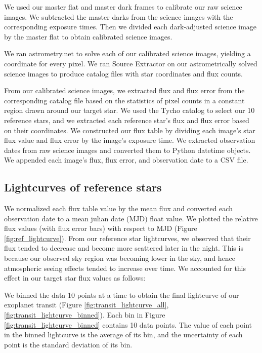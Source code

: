 \documentclass[twocolumn]{aastex631}
\begin{document}
We used our master flat and master dark frames to calibrate our raw science images. We subtracted the master darks from the science images with the corresponding exposure times. Then we divided each dark-adjusted science image by the master flat to obtain calibrated science images.

We ran astrometry.net to solve each of our calibrated science images, yielding a coordinate for every pixel. We ran Source Extractor on our astrometrically solved science images to produce catalog files with star coordinates and flux counts.

From our calibrated science images, we extracted flux and flux error from the corresponding catalog file based on the statistics of pixel counts in a constant region drawn around our target star. We used the Tycho catalog to select our 10 reference stars, and we extracted each reference star's flux and flux error based on their coordinates. We constructed our flux table by dividing each image's star flux value and flux error by the image's exposure time. We extracted observation dates from raw science images and converted them to Python datetime objects. We appended each image's flux, flux error, and observation date to a CSV file. 

\subsection{Lightcurves of reference stars} \label{subsec:refstarlightcurve}

We normalized each flux table value by the mean flux and converted each observation date to a mean julian date (MJD) float value. We plotted the relative flux values (with flux error bars) with respect to MJD (Figure \ref{fig:ref_lightcurve}). From our reference star lightcurves, we observed that their flux tended to decrease and become more scattered later in the night. This is because our observed sky region was becoming lower in the sky, and hence atmospheric seeing effects tended to increase over time. We accounted for this effect in our target star flux values as follows: 

We binned the data 10 points at a time to obtain the final lightcurve of our exoplanet transit (Figure \ref{fig:transit_lightcurve_all}, \ref{fig:transit_lightcurve_binned}). Each bin in Figure \ref{fig:transit_lightcurve_binned} contains 10 data points. The value of each point in the binned lightcurve is the average of its bin, and the uncertainty of each point is the standard deviation of its bin.
\end{document}
